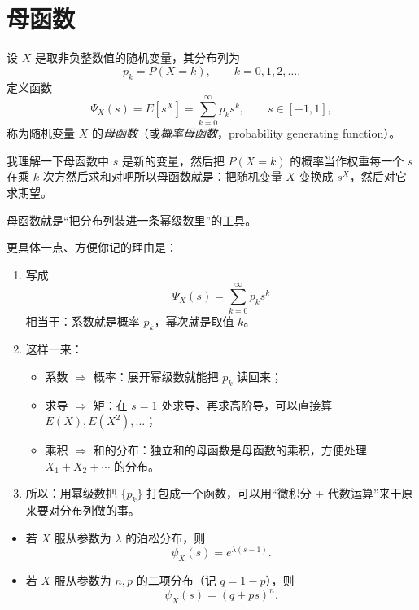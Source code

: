 \section{母函数}
\begin{definition}[母函数]
设 $X$ 是取非负整数值的随机变量，其分布列为
\[
p_k = P(X = k), \qquad k = 0,1,2,\dots.
\]
定义函数
\[
\Psi_X(s) = E[s^{X}]
= \sum_{k=0}^{\infty} p_k s^{k}, \qquad s\in[-1,1],
\]
称为随机变量 $X$ 的\emph{母函数}（或\emph{概率母函数}，probability generating function）。
\end{definition}
\begin{dxtips}
    我理解一下母函数中 $s$ 是新的变量，然后把 $P(X=k)$ 的概率当作权重每一个 $s$ 在乘 $k$ 次方然后求和对吧所以母函数就是：把随机变量 $X$ 变换成 $s^X$，然后对它求期望。
\end{dxtips}

\begin{note}
母函数就是“把分布列装进一条幂级数里”的工具。

更具体一点、方便你记的理由是：

\end{note}
\begin{note}
    

\begin{enumerate}
  \item 写成
  \[ 
    \Psi_X(s)=\sum_{k=0}^\infty p_k s^k
  \]
  相当于：系数就是概率 $p_k$，幂次就是取值 $k$。

  \item 这样一来：
  \begin{itemize}
    \item 系数 $\Rightarrow$ 概率：展开幂级数就能把 $p_k$ 读回来；
    \item 求导 $\Rightarrow$ 矩：在 $s=1$ 处求导、再求高阶导，可以直接算 $E(X), E(X^2), \dots$；
    \item 乘积 $\Rightarrow$ 和的分布：独立和的母函数是母函数的乘积，方便处理 $X_1+X_2+\cdots$ 的分布。
  \end{itemize}

  \item 所以：用幂级数把 $\{p_k\}$ 打包成一个函数，可以用“微积分 + 代数运算”来干原来要对分布列做的事。
\end{enumerate}
\end{note}
\begin{itemize}
  \item 若 $X$ 服从参数为 $\lambda$ 的泊松分布，则
  \[
    \psi_X(s)=e^{\lambda(s-1)} .
  \]

  \item 若 $X$ 服从参数为 $n,p$ 的二项分布（记 $q=1-p$），则
  \[
    \psi_X(s)=(q+ps)^n .
  \]
\end{itemize}


